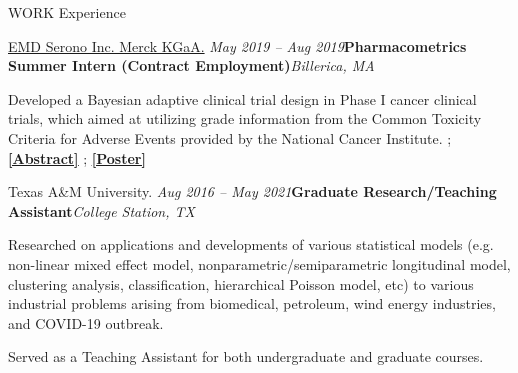 \documentclass[
	11pt, %
]{resume} %
\begin{document}
\begin{rSection}{WORK Experience}


\begin{rSubsection}{
\href{https://www.emdserono.com/us-en}{EMD Serono Inc. Merck KGaA.}
}{\em May 2019 -- Aug 2019}{\textbf{Pharmacometrics Summer Intern (Contract Employment)}}{\em Billerica, MA}
\item 
Developed a Bayesian adaptive clinical trial design in Phase I cancer clinical trials, which aimed at utilizing grade information from the Common Toxicity Criteria for Adverse Events provided by the National Cancer Institute. ; 
\href{https://sites.google.com/view/seyoonlee/home/projects/merck-group-summer-internship-project?authuser=0#h.lnkjghpa5ikt}
{\underline{\textbf{[Abstract]}}}
;
\href{https://www.dropbox.com/s/dnlynbzl6ojmgwh/ACOP_Se_Yoon_Lee_PhD.pdf?dl=0}
{\underline{\textbf{[Poster]}}}
\end{rSubsection}


\begin{rSubsection}{Texas A\&M University.
}{\em Aug 2016 -- May 2021}{\textbf{Graduate Research/Teaching Assistant}}{\em College Station, TX}
\item Researched on applications and developments of various statistical models (e.g. non-linear mixed effect model, nonparametric/semiparametric longitudinal model, clustering analysis, classification, hierarchical Poisson model, etc) to various industrial problems arising from biomedical, petroleum, wind energy industries, and COVID-19 outbreak.
\item Served as a Teaching Assistant for both undergraduate and graduate courses.
\end{rSubsection}


\end{rSection}

\end{document}
